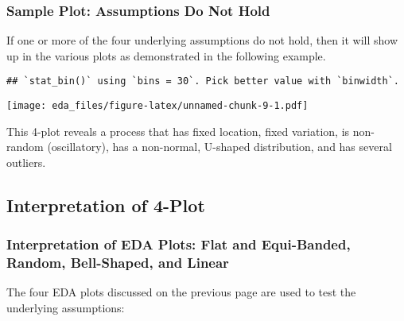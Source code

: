 \documentclass[]{book}
\newenvironment{Shaded}{\begin{snugshade}}{\end{snugshade}}
\newcommand{\KeywordTok}[1]{\textcolor[rgb]{0.13,0.29,0.53}{\textbf{#1}}}
\newcommand{\DataTypeTok}[1]{\textcolor[rgb]{0.13,0.29,0.53}{#1}}
\newcommand{\DecValTok}[1]{\textcolor[rgb]{0.00,0.00,0.81}{#1}}
\newcommand{\StringTok}[1]{\textcolor[rgb]{0.31,0.60,0.02}{#1}}
\newcommand{\OtherTok}[1]{\textcolor[rgb]{0.56,0.35,0.01}{#1}}
\newcommand{\OperatorTok}[1]{\textcolor[rgb]{0.81,0.36,0.00}{\textbf{#1}}}
\newcommand{\NormalTok}[1]{#1}
\theoremstyle{definition}
\theoremstyle{definition}
\theoremstyle{definition}
\theoremstyle{remark}
\begin{document}
\subsubsection{Sample Plot: Assumptions Do Not
Hold}\label{sample-plot-assumptions-do-not-hold}

If one or more of the four underlying assumptions do not hold, then it
will show up in the various plots as demonstrated in the following
example.

\begin{Shaded}
\end{Shaded}

\begin{verbatim}
## `stat_bin()` using `bins = 30`. Pick better value with `binwidth`.
\end{verbatim}

\texttt{[image: eda\_files/figure-latex/unnamed-chunk-9-1.pdf]}

This 4-plot reveals a process that has fixed location, fixed variation,
is non-random (oscillatory), has a non-normal, U-shaped distribution,
and has several outliers.

\subsection{Interpretation of 4-Plot}\label{interpretation-of-4-plot}

\subsubsection{Interpretation of EDA Plots: Flat and Equi-Banded,
Random, Bell-Shaped, and
Linear}\label{interpretation-of-eda-plots-flat-and-equi-banded-random-bell-shaped-and-linear}

The four EDA plots discussed on the previous page are used to test the
underlying assumptions:
\end{document}
